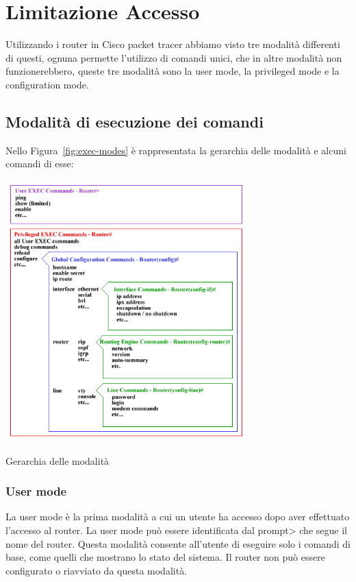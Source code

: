 \section{Limitazione Accesso}
Utilizzando i router in Cisco packet tracer abbiamo visto tre modalità differenti di questi, ognuna permette l’utilizzo di comandi unici, che in altre modalità non funzionerebbero, queste tre modalità sono la user mode, la privileged mode e la configuration mode.

\subsection{Modalità di esecuzione dei comandi}
Nello Figura~\ref{fig:exec-modes} è rappresentata la gerarchia delle modalità e alcuni comandi di esse:

\begin{sfigure}
    \centering
    \captionsetup{type=figure}
    \includegraphics[width=0.7\textwidth]{images/03.limitazione.accesso/01.exec-modes.png}
    \caption{Gerarchia delle modalità}
    \label{fig:exec-modes}
\end{sfigure}

\subsubsection{User mode}
La user mode è la prima modalità a cui un utente ha accesso dopo aver effettuato l’accesso al router. La user mode può essere identificata dal prompt> che segue il nome del router. Questa modalità consente all’utente di eseguire solo i comandi di base, come quelli che mostrano lo stato del sistema. Il router non può essere configurato o riavviato da questa modalità.

